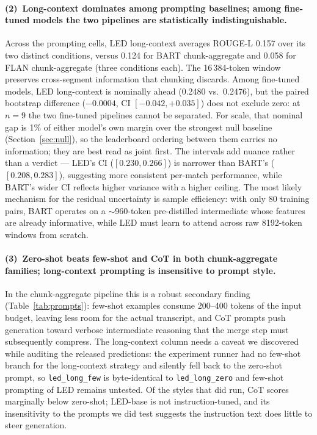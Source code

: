 \documentclass[10pt,a4paper]{article}
\begin{document}
\paragraph{(2)~Long-context dominates among prompting baselines; among fine-tuned models the two pipelines are statistically indistinguishable.}
Across the prompting cells, LED long-context averages ROUGE-L 0.157 over its two distinct conditions, versus 0.124 for BART chunk-aggregate and 0.058 for FLAN chunk-aggregate (three conditions each). The 16\,384-token window preserves cross-segment information that chunking discards. Among fine-tuned models, LED long-context is nominally ahead (0.2480 vs.\ 0.2476), but the paired bootstrap difference ($-0.0004$, CI $[-0.042, +0.035]$) does not exclude zero: at $n=9$ the two fine-tuned pipelines cannot be separated. For scale, that nominal gap is 1\% of either model's own margin over the strongest null baseline (Section~\ref{sec:null}), so the leaderboard ordering between them carries no information; they are best read as joint first. The intervals add nuance rather than a verdict --- LED's CI ($[0.230, 0.266]$) is narrower than BART's ($[0.208, 0.283]$), suggesting more consistent per-match performance, while BART's wider CI reflects higher variance with a higher ceiling. The most likely mechanism for the residual uncertainty is sample efficiency: with only 80 training pairs, BART operates on a $\sim$960-token pre-distilled intermediate whose features are already informative, while LED must learn to attend across raw 8192-token windows from scratch.

\paragraph{(3)~Zero-shot beats few-shot and CoT in both chunk-aggregate families; long-context prompting is insensitive to prompt style.}
In the chunk-aggregate pipeline this is a robust secondary finding (Table~\ref{tab:prompts}): few-shot examples consume 200--400 tokens of the input budget, leaving less room for the actual transcript, and CoT prompts push generation toward verbose intermediate reasoning that the merge step must subsequently compress. The long-context column needs a caveat we discovered while auditing the released predictions: the experiment runner had no few-shot branch for the long-context strategy and silently fell back to the zero-shot prompt, so \texttt{led\_long\_few} is byte-identical to \texttt{led\_long\_zero} and few-shot prompting of LED remains untested. Of the styles that did run, CoT scores marginally below zero-shot; LED-base is not instruction-tuned, and its insensitivity to the prompts we did test suggests the instruction text does little to steer generation.
\end{document}
